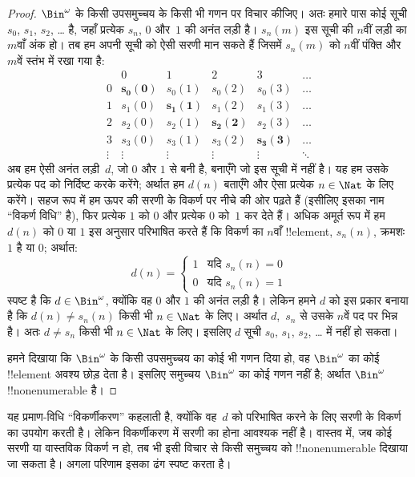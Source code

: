 \documentclass[../../../include/open-logic-section]{subfiles}
\begin{document}
\begin{proof}
$\Bin^\omega$ के किसी उपसमुच्चय के किसी भी गणन पर विचार कीजिए। अतः हमारे
पास कोई सूची $s_{0}$, $s_{1}$, $s_{2}$, \dots{} है, जहाँ प्रत्येक $s_n$,
$0$ और~$1$ की अनंत लड़ी है। $s_n(m)$ इस सूची की $n$वीं लड़ी का $m$वाँ अंक
हो। तब हम अपनी सूची को ऐसी सरणी मान सकते हैं जिसमें $s_n(m)$ को $n$वीं
पंक्ति और $m$वें स्तंभ में रखा गया है:
\[
\begin{array}{c|c|c|c|c|c}
& 0 & 1 & 2 & 3 & \dots \\\hline
0 & \mathbf{s_{0}(0)} & s_{0}(1) & s_{0}(2) & s_0(3) & \dots \\\hline
1 & s_{1}(0)& \mathbf{s_{1}(1)} & s_1(2) & s_1(3) & \dots \\\hline
2 & s_{2}(0)& s_{2}(1) & \mathbf{s_2(2)} & s_2(3) & \dots \\\hline
3 & s_{3}(0)& s_{3}(1) & s_3(2) & \mathbf{s_3(3)} & \dots \\\hline
\vdots & \vdots & \vdots & \vdots & \vdots & \mathbf{\ddots}
\end{array}
\]
अब हम ऐसी अनंत लड़ी~$d$, जो $0$ और $1$ से बनी है, बनाएँगे जो इस सूची में नहीं है। यह
हम उसके प्रत्येक पद को निर्दिष्ट करके करेंगे; अर्थात हम $d(n)$ बताएँगे और ऐसा
प्रत्येक $n \in \Nat$ के लिए करेंगे। सहज रूप में हम ऊपर की सरणी के विकर्ण
पर नीचे की ओर पढ़ते हैं (इसीलिए इसका नाम ``विकर्ण विधि'' है), फिर प्रत्येक
$1$ को $0$ और प्रत्येक $0$ को~$1$ कर देते हैं। अधिक अमूर्त रूप में हम
$d(n)$ को $0$ या $1$ इस अनुसार परिभाषित करते हैं कि विकर्ण का
$n$वाँ !!{element}, $s_n(n)$, क्रमशः $1$ है या $0$; अर्थात:
\[
d(n) =
\begin{cases}
1 & \text{यदि $s_{n}(n) = 0$}\\
0 & \text{यदि $s_{n}(n) = 1$}
\end{cases}
\]
स्पष्ट है कि $d \in \Bin^\omega$, क्योंकि वह $0$ और $1$ की अनंत लड़ी है।
लेकिन हमने $d$ को इस प्रकार बनाया है कि $d(n) \neq s_n(n)$ किसी भी
$n \in \Nat$ के लिए। अर्थात $d$,~$s_n$ से उसके $n$वें पद पर भिन्न है। अतः
$d \neq s_n$ किसी भी $n\in \Nat$ के लिए। इसलिए $d$ सूची $s_0$, $s_1$,
$s_2$, \dots{} में नहीं हो सकता।

हमने दिखाया कि $\Bin^\omega$ के किसी उपसमुच्चय का कोई भी गणन दिया हो, वह
$\Bin^\omega$ का कोई !!{element} अवश्य छोड़ देता है। इसलिए समुच्चय
$\Bin^\omega$ का कोई गणन नहीं है; अर्थात $\Bin^\omega$
!!{nonenumerable} है।
\end{proof}

\begin{explain}
यह प्रमाण-विधि ``विकर्णीकरण'' कहलाती है, क्योंकि वह~$d$ को परिभाषित करने
के लिए सरणी के विकर्ण का उपयोग करती है। लेकिन विकर्णीकरण में सरणी का होना
आवश्यक नहीं है। वास्तव में, जब कोई सरणी या वास्तविक विकर्ण न हो, तब भी इसी
विचार से किसी समुच्चय को !!{nonenumerable} दिखाया जा सकता है। अगला परिणाम
इसका ढंग स्पष्ट करता है।
\end{explain}
\end{document}
